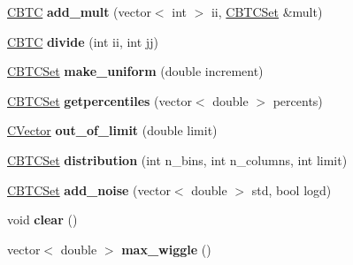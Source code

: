 \begin{DoxyCompactItemize}
\item 
\mbox{\label{class_c_b_t_c_set_a015c532d4c59ea72fe33a5682f4e5f04}} 
\hyperlink{class_c_b_t_c}{C\+B\+TC} {\bfseries add\+\_\+mult} (vector$<$ int $>$ ii, \hyperlink{class_c_b_t_c_set}{C\+B\+T\+C\+Set} \&mult)
\item 
\mbox{\label{class_c_b_t_c_set_a1636cd7e3abe4bd3cd834f14e0eddd52}} 
\hyperlink{class_c_b_t_c}{C\+B\+TC} {\bfseries divide} (int ii, int jj)
\item 
\mbox{\label{class_c_b_t_c_set_ad31a3cfb5eb106760f2b1c7421b6c324}} 
\hyperlink{class_c_b_t_c_set}{C\+B\+T\+C\+Set} {\bfseries make\+\_\+uniform} (double increment)
\item 
\mbox{\label{class_c_b_t_c_set_a229674ae96dbc0eda53bb49647ca5662}} 
\hyperlink{class_c_b_t_c_set}{C\+B\+T\+C\+Set} {\bfseries getpercentiles} (vector$<$ double $>$ percents)
\item 
\mbox{\label{class_c_b_t_c_set_a066e321ba1487fbb340582abfc080f51}} 
\hyperlink{class_c_vector}{C\+Vector} {\bfseries out\+\_\+of\+\_\+limit} (double limit)
\item 
\mbox{\label{class_c_b_t_c_set_ada2a097690eec5af62f6f6f0491c5f29}} 
\hyperlink{class_c_b_t_c_set}{C\+B\+T\+C\+Set} {\bfseries distribution} (int n\+\_\+bins, int n\+\_\+columns, int limit)
\item 
\mbox{\label{class_c_b_t_c_set_adeb9bbdede3ff0861690b0c9fb482c9d}} 
\hyperlink{class_c_b_t_c_set}{C\+B\+T\+C\+Set} {\bfseries add\+\_\+noise} (vector$<$ double $>$ std, bool logd)
\item 
\mbox{\label{class_c_b_t_c_set_ad67daa07837768d401682fbf287b56ea}} 
void {\bfseries clear} ()
\item 
\mbox{\label{class_c_b_t_c_set_a3484287347b537ed609814d92aae146d}} 
vector$<$ double $>$ {\bfseries max\+\_\+wiggle} ()
\item 
\mbox{\label{class_c_b_t_c_set_afdaa1063734b7a0af36cee28cb0ecf5d}} 

\end{DoxyCompactItemize}
